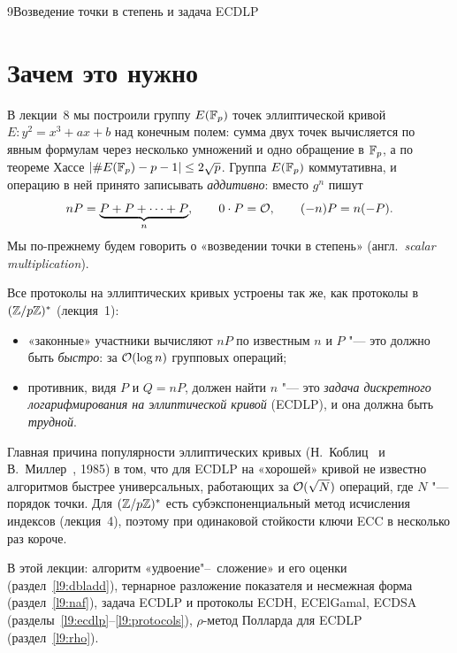 \begin{lecture}{9}{Возведение точки в степень и задача ECDLP}

\section{Зачем это нужно}

В лекции~8 мы построили группу $E(\mathbb{F}_p)$ точек эллиптической кривой
$E\colon y^2 = x^3 + ax + b$ над конечным полем: сумма двух точек вычисляется по явным формулам
через несколько умножений и одно обращение в $\mathbb{F}_p$, а по теореме Хассе
$\lvert\#E(\mathbb{F}_p) - p - 1\rvert \le 2\sqrt p$. Группа $E(\mathbb{F}_p)$ коммутативна, и операцию в ней
принято записывать \emph{аддитивно}: вместо $g^n$ пишут
\[
  nP = \underbrace{P + P + \cdots + P}_{n}, \qquad 0 \cdot P = \mathcal{O}, \qquad (-n)P = n(-P).
\]
Мы по-прежнему будем говорить о «возведении точки в степень» (англ.\ \emph{scalar
multiplication}).

Все протоколы на эллиптических кривых устроены так же, как протоколы в $(\mathbb{Z}/p\mathbb{Z})^{*}$ (лекция~1):
\begin{itemize}
  \item «законные» участники вычисляют $nP$ по известным $n$ и $P$ "--- это должно быть
    \emph{быстро}: за $\mathcal{O}(\log n)$ групповых операций;
  \item противник, видя $P$ и $Q = nP$, должен найти $n$ "--- это \emph{задача
    дискретного логарифмирования на эллиптической кривой} (ECDLP), и она должна быть
    \emph{трудной}.
\end{itemize}
Главная причина популярности эллиптических кривых (Н.~Коблиц~\cite{koblitz-ecc} и
В.~Миллер~\cite{miller-ecc}, 1985) в том, что для ECDLP на «хорошей» кривой не известно
алгоритмов быстрее универсальных, работающих за $\mathcal{O}(\sqrt N)$ операций, где $N$ "--- порядок
точки. Для $(\mathbb{Z}/p\mathbb{Z})^{*}$ есть субэкспоненциальный метод исчисления индексов (лекция~4), поэтому
при одинаковой стойкости ключи ECC в несколько раз короче.

В этой лекции: алгоритм «удвоение"--~сложение» и его оценки (раздел~\ref{l9:dbladd}),
тернарное разложение показателя и несмежная форма (раздел~\ref{l9:naf}), задача ECDLP и
протоколы ECDH, ECElGamal, ECDSA (разделы~\ref{l9:ecdlp}--\ref{l9:protocols}), $\rho$-метод
Полларда для ECDLP (раздел~\ref{l9:rho}).


\end{lecture}
